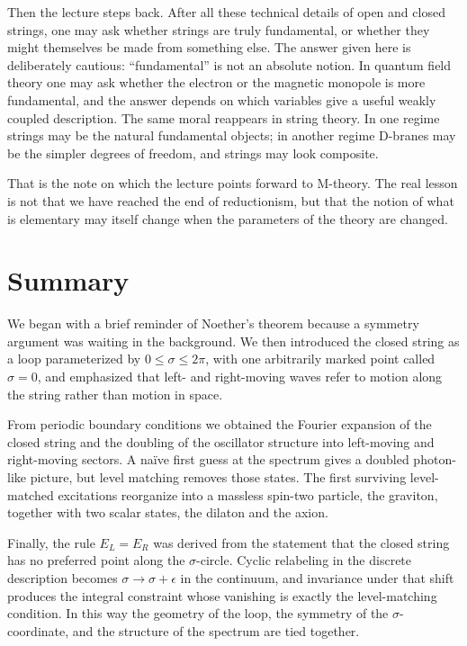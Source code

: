 Then the lecture steps back. After all these technical details of open and closed strings, one may ask whether strings are truly fundamental, or whether they might themselves be made from something else. The answer given here is deliberately cautious: ``fundamental'' is not an absolute notion. In quantum field theory one may ask whether the electron or the magnetic monopole is more fundamental, and the answer depends on which variables give a useful weakly coupled description. The same moral reappears in string theory. In one regime strings may be the natural fundamental objects; in another regime D-branes may be the simpler degrees of freedom, and strings may look composite.

That is the note on which the lecture points forward to M-theory. The real lesson is not that we have reached the end of reductionism, but that the notion of what is elementary may itself change when the parameters of the theory are changed.

\section{Summary}

We began with a brief reminder of Noether's theorem because a symmetry argument was waiting in the background. We then introduced the closed string as a loop parameterized by \(0\leq \sigma\leq 2\pi\), with one arbitrarily marked point called \(\sigma=0\), and emphasized that left- and right-moving waves refer to motion along the string rather than motion in space.

From periodic boundary conditions we obtained the Fourier expansion of the closed string and the doubling of the oscillator structure into left-moving and right-moving sectors. A naïve first guess at the spectrum gives a doubled photon-like picture, but level matching removes those states. The first surviving level-matched excitations reorganize into a massless spin-two particle, the graviton, together with two scalar states, the dilaton and the axion.

Finally, the rule \(E_L=E_R\) was derived from the statement that the closed string has no preferred point along the \(\sigma\)-circle. Cyclic relabeling in the discrete description becomes \(\sigma\to \sigma+\epsilon\) in the continuum, and invariance under that shift produces the integral constraint whose vanishing is exactly the level-matching condition. In this way the geometry of the loop, the symmetry of the \(\sigma\)-coordinate, and the structure of the spectrum are tied together.